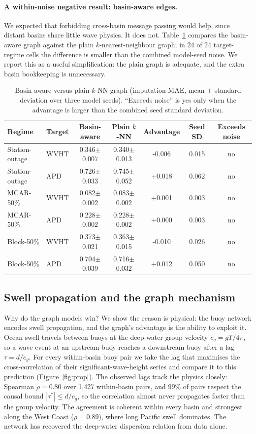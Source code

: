 \documentclass[11pt]{article}
\begin{document}
\paragraph{A within-noise negative result: basin-aware edges.}
We expected that forbidding cross-basin message passing would help, since distant
basins share little wave physics. It does not. Table~\ref{tab:abl} compares the
basin-aware graph against the plain $k$-nearest-neighbour graph; in 24
of 24 target-regime cells the difference is smaller than the combined
model-seed noise. We report this as a useful simplification: the plain graph is
adequate, and the extra basin bookkeeping is unnecessary.

\begin{table}[t]
\centering
\caption{Basin-aware versus plain $k$-NN graph (imputation MAE, mean $\pm$
standard deviation over three model seeds). ``Exceeds noise'' is yes only when
the advantage is larger than the combined seed standard deviation.}
\label{tab:abl}
\small
\begin{tabular}{l l cc c c c}
\toprule
Regime & Target & Basin-aware & Plain $k$-NN & Advantage & Seed SD & Exceeds noise\\
\midrule
Station-outage & WVHT & 0.346$\pm$0.007 & 0.340$\pm$0.013 & -0.006 & 0.015 & no \\
Station-outage & APD & 0.726$\pm$0.033 & 0.745$\pm$0.052 & +0.018 & 0.062 & no \\
MCAR-50\% & WVHT & 0.082$\pm$0.002 & 0.083$\pm$0.002 & +0.001 & 0.003 & no \\
MCAR-50\% & APD & 0.228$\pm$0.002 & 0.228$\pm$0.002 & +0.000 & 0.003 & no \\
Block-50\% & WVHT & 0.373$\pm$0.021 & 0.363$\pm$0.015 & -0.010 & 0.026 & no \\
Block-50\% & APD & 0.704$\pm$0.039 & 0.716$\pm$0.032 & +0.012 & 0.050 & no \\
\bottomrule
\end{tabular}
\end{table}

\subsection{Swell propagation and the graph mechanism}
\label{sec:propagation}
Why do the graph models win? We show the reason is physical: the buoy network encodes
swell propagation, and the graph's advantage is the ability to exploit it. Ocean swell
travels between buoys at the deep-water group velocity $c_g = gT/4\pi$, so a wave event
at an upstream buoy reaches a downstream buoy after a lag $\tau = d/c_g$. For every
within-basin buoy pair we take the lag that maximises the cross-correlation of their
significant-wave-height series and compare it to this prediction
(Figure~\ref{fig:prop}). The observed lags track the physics closely: Spearman
$\rho=0.80$ over 1{,}427 within-basin pairs, and 99\% of pairs respect
the causal bound $|\tau^{*}|\le d/c_g$, so the correlation almost never propagates faster
than the group velocity. The agreement is coherent within every basin and strongest along
the West Coast ($\rho=0.89$), where long Pacific swell dominates. The network has
recovered the deep-water dispersion relation from data alone.
\end{document}
